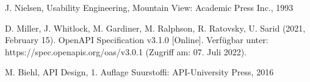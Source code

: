 \begin{thebibliography}{1}
J. Nielsen, Usability Engineering, Mountain View: Academic Press Inc., 1993

D. Miller, J. Whitlock, M. Gardiner, M. Ralphson, R. Ratovsky, U. Sarid (2021, February 15). OpenAPI Specification v3.1.0 [Online]. Verfügbar unter: 
https://spec.openapis.org/oas/v3.0.1
(Zugriff am: 07. Juli 2022).

M. Biehl, API Design, 1. Auflage Suurstoffi: API-University Press, 2016

\end{thebibliography}